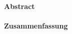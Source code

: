 \cleardoublepage
\thispagestyle{plain}

\makeatletter
\begin{center}
	\large\textbf{\@title}\\
	\normalsize\@author
\end{center}
\makeatother

\paragraph{Abstract}

\lipsum[1-1]

\begin{otherlanguage}{ngerman}

\paragraph{Zusammenfassung}

\lipsum[1-1]

\end{otherlanguage}
